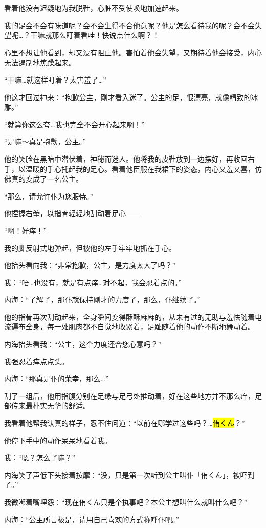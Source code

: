 看着他没有迟疑地为我脱鞋，心脏不受使唤地加速起来。

我的足会不会有味道呢？会不会生得不合他意呢？他是怎么看待我的呢？会不会失望呢…？干嘛就那么盯着看哇！快说点什么啊？！

心里不想让他看到，却又没有阻止他。害怕着他会失望，又期待着他会接受，内心无法遏制地焦躁起来。

“干嘛…就这样盯着？太害羞了…”

他这才回过神来：“抱歉公主，刚才看入迷了。公主的足，很漂亮，就像精致的冰雕。”

“就算你这么夸…我也完全不会开心起来啊！”

“是嘛～真是抱歉，公主。”

他的笑脸在黑暗中潜伏着，神秘而迷人。他将我的皮鞋放到一边摆好，再收回右手，以温暖的手心托起我的足心。看着他臣服在我裙下的姿态，内心又羞又喜，仿佛真的变成了一名公主。

“那么，请允许仆为您服侍。”

他捏握右拳，以指骨轻轻地刮动着足心——

“啊！好痒！”

我的脚反射式地弹起，但被他的左手牢牢地抓在手心。

他抬头看向我：“非常抱歉，公主，是力度太大了吗？”

我：“唔…也没有，就是有点痒…对不起，我会忍着点的。”

内海：“了解了，那仆就保持刚才的力度了，那么，仆继续了。”

他的指骨再次刮动起来，全身瞬间变得酥酥麻麻的，从未有过的无助与羞怯随着电流遍布全身，每一处肌肉都不自觉地收紧着，足趾随着他的动作不断地舞动着。

内海抬头看我：“公主，这个力度还合您心意吗？”

我强忍着痒点点头。

内海：“那真是仆的荣幸，那么…”

刮了一组后，他用指腹分别在足缘与足弓处推动着，好在这些地方并不那么痒，足部传来最朴实无华的舒适。

我看着他帮我认真的样子，忍不住问道：“以前在哪学过这些吗？…\hl{侑くん}？”

他停下手中的动作呆呆地看着我。

我：“嗯？怎么了嘛？”

内海笑了声低下头接着按摩：“没，只是第一次听到公主叫仆「侑くん」，被吓到了。”

我微嘟着嘴埋怨：“现在侑くん只是个执事吧？本公主想叫什么就叫什么吧？”

内海：“公主所言极是，请用自己喜欢的方式称呼仆吧。”

